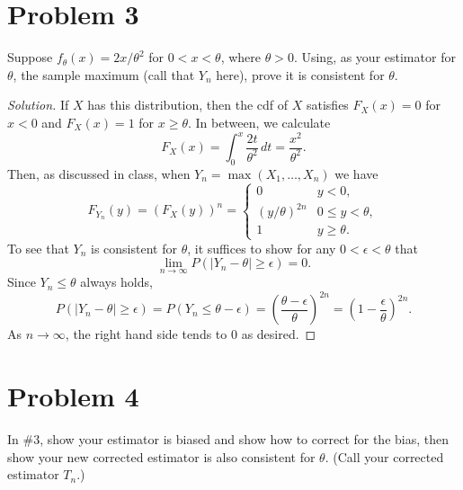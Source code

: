 \documentclass{article}
\begin{document}
\section*{Problem 3}
Suppose $f_{\theta}(x) = 2x/\theta^2$ for $0 < x < \theta$, where $\theta > 0$. Using, as your estimator for $\theta$, the sample maximum (call that $Y_n$ here), prove it is consistent for $\theta$.

\begin{proof}[Solution]
If $X$ has this distribution, then the cdf of $X$ satisfies $F_X(x) = 0$ for $x < 0$ and $F_X(x) = 1$ for $x\geq\theta$. In between, we calculate
\begin{equation*}
F_X(x) = \int_0^x\frac{2t}{\theta^2}\,dt = \frac{x^2}{\theta^2}.
\end{equation*}
Then, as discussed in class, when $Y_n = \max(X_1, \ldots, X_n)$ we have
\begin{equation*}
F_{Y_n}(y) = (F_X(y))^n = \begin{cases} 0 & y < 0, \\ (y/\theta)^{2n} & 0\leq y < \theta, \\ 1 & y\geq\theta. \end{cases}
\end{equation*}
To see that $Y_n$ is consistent for $\theta$, it suffices to show for any $0 < \epsilon < \theta$ that
\begin{equation*}
\lim_{n\to\infty} P(\lvert Y_n - \theta\rvert\geq\epsilon) = 0.
\end{equation*}
Since $Y_n\leq\theta$ always holds, 
\begin{equation*}
P(\lvert Y_n - \theta\rvert\geq\epsilon) = P(Y_n\leq\theta - \epsilon) = \left(\frac{\theta - \epsilon}{\theta}\right)^{2n} = \left(1 - \frac{\epsilon}{\theta}\right)^{2n}.
\end{equation*}
As $n\to\infty$, the right hand side tends to $0$ as desired.
\end{proof}


\newpage
\section*{Problem 4}
In \#3, show your estimator is biased and show how to correct for the bias, then show your new corrected estimator is also consistent for $\theta$. (Call your corrected estimator $T_n$.)
\end{document}
